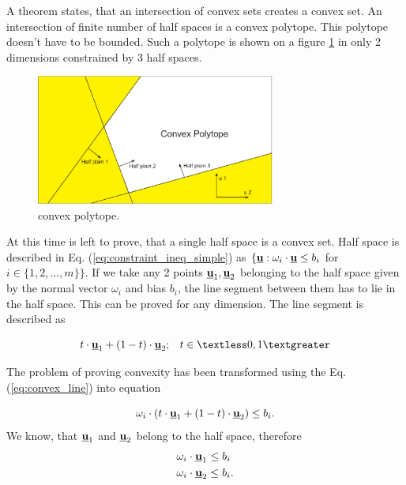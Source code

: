 \documentclass[a4paper,11pt,titlepage]{article}
\newcommand{\uvec}{\textbf{\underline{u}}}
\begin{document}
A theorem states, that an intersection of convex sets creates a convex set. An intersection of finite number of half spaces is a convex polytope. This polytope doesn't have to be bounded. Such a polytope is shown on a figure \ref{fig:convex_polytope} in only 2 dimensions constrained by 3 half spaces.

\begin{figure}[h]
\centering
\includegraphics[width=0.7\textwidth]{fig/convex_polytope.eps} 
\caption{convex polytope.}
\label{fig:convex_polytope}
\end{figure}

At this time is left to prove, that a single half space is a convex set. Half space is described in Eq. (\ref{eq:constraint_ineq_simple}) as $\{\uvec : \omega_i \cdot \uvec \leq b_i$ for $i \in \{1, 2, ..., m\}\}$. If we take any 2 points $\uvec_1, \uvec_2$ belonging to the half space given by the normal vector $\omega_i$ and bias $b_i$, the line segment between them has to lie in the half space. This can be proved for any dimension. The line segment is described as

\begin{equation}
\label{eq:convex_line}
t \cdot \uvec_1 + (1-t) \cdot \uvec_2; \;\;\; t \in \textless 0, 1 \textgreater
\end{equation}

The problem of proving convexity has been transformed using the Eq. (\ref{eq:convex_line}) into equation 

\begin{equation}
\label{eq:convex_u_proof}
\omega_i \cdot (t \cdot \uvec_1 + (1-t) \cdot \uvec_2) \leq b_i.
\end{equation}
We know, that $\uvec_1$ and $\uvec_2$ belong to the half space, therefore 
\begin{equation}
\begin{split}
\omega_i \cdot \uvec_1 &\leq b_i\\
\omega_i \cdot \uvec_2 &\leq b_i.
\end{split}
\end{equation}
\end{document}
